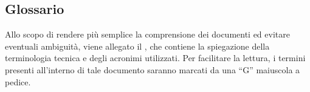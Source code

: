 \subsection{Glossario}
	Allo scopo di rendere più semplice la comprensione dei documenti ed evitare eventuali ambiguità, viene allegato il , che contiene la spiegazione della terminologia tecnica e degli acronimi utilizzati. Per facilitare la lettura, i termini presenti all'interno di tale documento saranno marcati da una “G” maiuscola a pedice.
